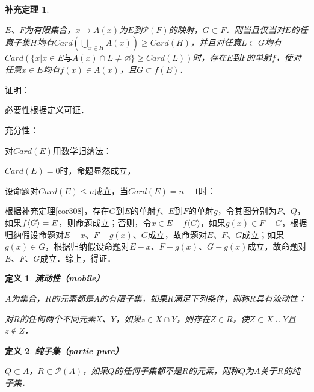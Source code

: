 \documentclass[12pt, a4paper, oneside]{book}
\newtheorem{cor}{补充定理}
\newtheorem{de}{定义}
\begin{document}
			\begin{cor}\label{cor309}
				\hfill\par
				$E$、$F$为有限集合，$x\to A(x)$为$E$到$\mathcal{P}(F)$的映射，$G\subset F$．则当且仅当对$E$的任意子集$H$均有$Card(\bigcup\limits_{x\in H}A(x))\geq Card(H)$，并且对任意$L\subset G$均有$Card(\{x|x\in E\text{与}A(x)\cap L\neq \varnothing\}\geq Card(L))$时，存在$E$到$F$的单射$f$，使对任意$x\in E$均有$f(x)\in A(x)$，且$G\subset f(E)$．
			\end{cor}
			证明：
			\par
			必要性根据定义可证．
			\par
			充分性：
			\par
			对$Card(E)$用数学归纳法：
			\par
			$Card(E)=0$时，命题显然成立，
			\par
			设命题对$Card(E)\leq n$成立，当$Card(E)=n+1$时：
			\par
			根据补充定理\ref{cor308}，存在$G$到$E$的单射$f$、$E$到$F$的单射$g$，令其图分别为$P$、$Q$，如果$f\\\langle G\rangle=E$，则命题成立；否则，令$x\in E-f\langle G\rangle$，如果$g(x)\in F-G$，根据归纳假设命题对$E-x$、$F-g(x)$、$G$成立，故命题对$E$、$F$、$G$成立；如果$g(x)\in G$，根据归纳假设命题对$E-x$、$F-g(x)$、$G-g(x)$成立，故命题对$E$、$F$、$G$成立．综上，得证．
						
			\begin{de}
				\textbf{流动性（mobile）}
				\par
				$A$为集合，$R$的元素都是$A$的有限子集，如果$R$满足下列条件，则称$R$具有流动性：
				\par
				对$R$的任何两个不同元素$X$、$Y$，如果$z\in X\cap Y$，则存在$Z\in R$，使$Z\subset X\cup Y$且$z\notin Z$．
			\end{de}
			
			\begin{de}
				\textbf{纯子集（partie pure）}
				\par
				$Q\subset A$，$R\subset \mathcal{P}(A)$，如果$Q$的任何子集都不是$R$的元素，则称$Q$为$A$关于$R$的纯子集．
			\end{de}
\end{document}
